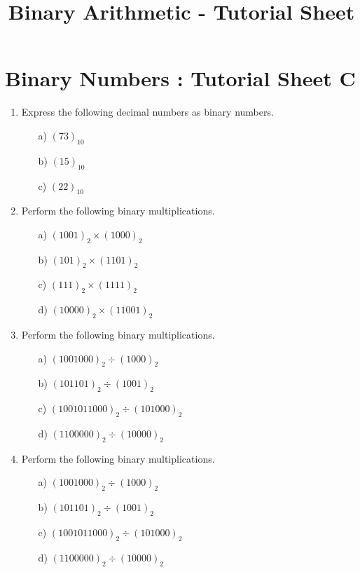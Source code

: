 \documentclass[]{article}
\title{Binary Arithmetic - Tutorial Sheet}
\begin{document}
\section*{Binary Numbers : Tutorial Sheet C}
\begin{enumerate}
\item Express the following decimal numbers as binary numbers.
  \begin{multicols}{4}
    \begin{itemize}
    \item[a)] $(73)_{10}$
    \item[b)] $(15)_{10}$
    \item[c)] $(22)_{10}$
    \end{itemize}
  \end{multicols}
  
  


\item Perform the following binary multiplications.
\begin{multicols}{2}
\begin{itemize}
\item[a)] $(1001)_{2}\times( 1000)_{2}$  %
\item[b)] $(101)_{2}\times(1101)_{2}$ %
\item[c)] $(111)_{2}\times(1111)_{2}$ %
\item[d)] $(10000)_{2}\times(11001)_{2}$    %
\end{itemize}
 \end{multicols}

	\item Perform the following binary multiplications.
	\begin{multicols}{2}
	\begin{itemize}
	\item[a)] $(1001000)_{2} \div ( 1000)_{2}$
	\item[b)] $(101101)_{2} \div (1001)_{2}$
	\item[c)] $(1001011000)_{2} \div (101000)_{2}$
	\item[d)] $(1100000)_{2} \div (10000)_{2}$
	\end{itemize}
	\end{multicols}
	


\item Perform the following binary multiplications.
\begin{multicols}{2}
\begin{itemize}
\item[a)] $(1001000)_{2} \div ( 1000)_{2}$
\item[b)] $(101101)_{2} \div (1001)_{2}$
\item[c)] $(1001011000)_{2} \div (101000)_{2}$
\item[d)] $(1100000)_{2} \div (10000)_{2}$
\end{itemize}
\end{multicols}




\end{enumerate}
\end{document}
